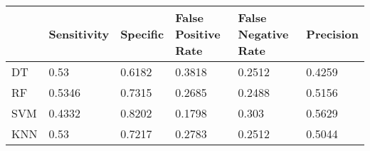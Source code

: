\begin{table}[!h]
\begin{tabular}{l | l | l| l| l | l}
 & Sensitivity & Specific & False Positive Rate & False Negative Rate & Precision \\\hline
DT & 0.53 & 0.6182 & 0.3818 & 0.2512 & 0.4259\\
RF & 0.5346 & 0.7315 & 0.2685 & 0.2488 & 0.5156\\
SVM & 0.4332 & 0.8202 & 0.1798 & 0.303 & 0.5629\\
KNN & 0.53 & 0.7217 & 0.2783 & 0.2512 & 0.5044\\
\end{tabular}
\caption{}
\end{table}

